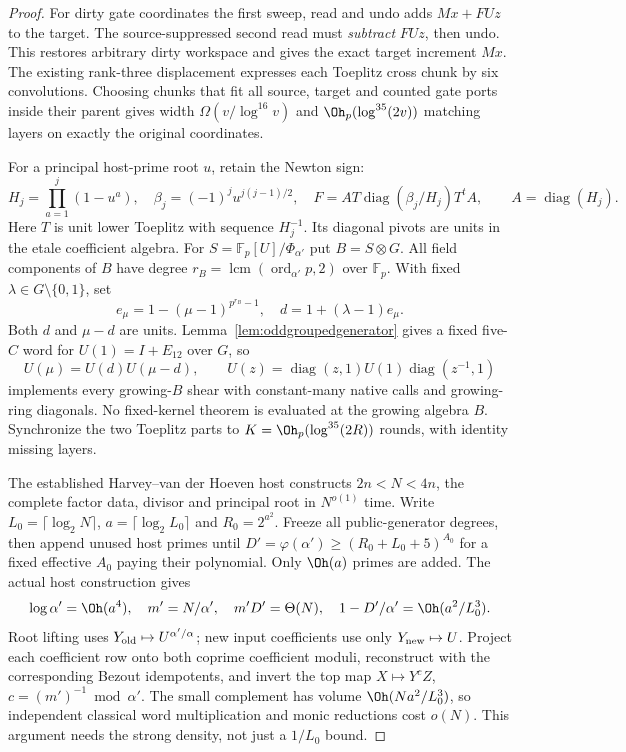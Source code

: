 \begin{proof}
For dirty gate coordinates the first sweep, read and undo adds
$Mx+FUz$ to the target. The source-suppressed second read must
\emph{subtract} $FUz$, then undo. This restores arbitrary dirty
workspace and gives the exact target increment $Mx$. The existing
rank-three displacement expresses each Toeplitz cross chunk by six
convolutions. Choosing chunks that fit all source, target and counted
gate ports inside their parent gives width
$\Omega(v/\log^{16}v)$ and $\Oh_p(\log^{35}(2v))$ matching layers
on exactly the original coordinates.

For a principal host-prime root $u$, retain the Newton sign:
\[
 H_j=\prod_{a=1}^j(1-u^a),\quad
 \beta_j=(-1)^j u^{j(j-1)/2},\quad
 F=A T\operatorname{diag}(\beta_j/H_j)T^t A,
 \qquad A=\operatorname{diag}(H_j).
\]
Here $T$ is unit lower Toeplitz with sequence $H_j^{-1}$. Its
diagonal pivots are units in the etale coefficient algebra.
For $S=\mathbb F_p[U]/\Phi_{\alpha'}$ put $B=S\otimes G$.
All field components of $B$ have degree
$r_B=\operatorname{lcm}(\operatorname{ord}_{\alpha'}p,2)$ over
$\mathbb F_p$. With fixed $\lambda\in G\setminus\{0,1\}$, set
\[
 e_\mu=1-(\mu-1)^{p^{r_B}-1},\quad
 d=1+(\lambda-1)e_\mu.
\]
Both $d$ and $\mu-d$ are units. Lemma~\ref{lem:oddgroupedgenerator}
gives a fixed five-$C$ word for $U(1)=I+E_{12}$ over $G$, so
\[
 U(\mu)=U(d)U(\mu-d),\qquad
 U(z)=\operatorname{diag}(z,1)U(1)\operatorname{diag}(z^{-1},1)
\]
implements every growing-$B$ shear with constant-many native calls
and growing-ring diagonals. No fixed-kernel theorem is evaluated at
the growing algebra $B$. Synchronize the two Toeplitz parts to
$K=\Oh_p(\log^{35}(2R))$ rounds, with identity missing layers.

The established Harvey--van der Hoeven host constructs
$2n<N<4n$, the complete factor data, divisor and principal root in
$N^{o(1)}$ time. Write $L_0=\lceil\log_2N\rceil$,
$a=\lceil\log_2L_0\rceil$ and $R_0=2^{a^2}$. Freeze all
public-generator degrees, then append unused host primes until
$D'=\varphi(\alpha')\ge(R_0+L_0+5)^{A_0}$ for a fixed effective
$A_0$ paying their polynomial. Only $\Oh(a)$ primes are added.
The actual host construction gives
\[
 \log\alpha'=\Oh(a^4),\quad m'=N/\alpha',\quad
 m'D'=\Theta(N),\quad
 1-D'/\alpha'=\Oh(a^2/L_0^3).
\]
Root lifting uses $Y_{\rm old}\mapsto U^{\alpha'/\alpha}$;
new input coefficients use only $Y_{\rm new}\mapsto U$.
Project each coefficient row onto both coprime coefficient moduli,
reconstruct with the corresponding Bezout idempotents, and invert the
top map $X\mapsto Y^cZ$, $c=(m')^{-1}\bmod\alpha'$. The small complement has volume
$\Oh(Na^2/L_0^3)$, so independent classical word multiplication
and monic reductions cost $o(N)$. This argument needs the strong
density, not just a $1/L_0$ bound.


\end{proof}

